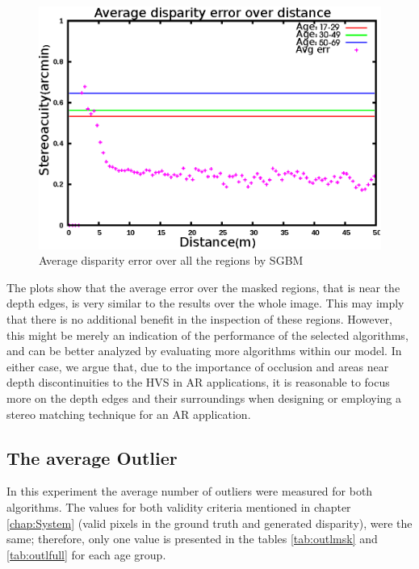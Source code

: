 \begin{figure}[H]
\centering
\includegraphics[scale=0.8]{sgbmfull3}
\caption{Average disparity error over all the regions by SGBM}
\label{fig:sgbmfull3}
\end{figure} 

The plots show that the average error over the masked regions, that is near the depth edges, is very similar to the results over the whole image. 
This may imply that there is no additional benefit in the inspection of these regions. 
However, this might be merely an indication of the performance of the selected algorithms, and can be better analyzed by evaluating more algorithms 
within our model.
In either case, we argue that, due to the importance of occlusion and areas near depth discontinuities to the HVS in AR applications, 
it is reasonable to focus more on the depth edges and their surroundings when designing or employing a stereo matching technique for an AR application.

\subsection{The average Outlier}
In this experiment the average number of outliers were measured for both algorithms. 
The values for both validity criteria mentioned in chapter \ref{chap:System} (valid pixels in the ground truth and generated disparity), were the same; therefore,
only one value is presented in the tables \ref{tab:outlmsk} and \ref{tab:outlfull} for each age group. \newline

